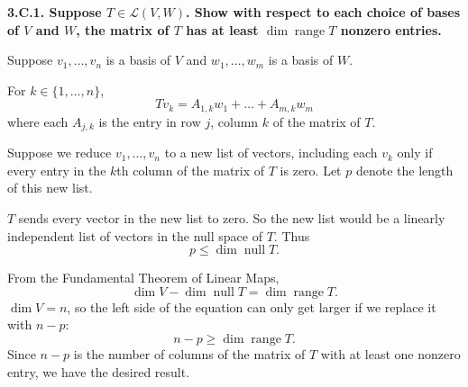 \documentclass[a5paper]{article}
\begin{document}
\newcommand   \C           {\mathbf{C}}
\newcommand   \R           {\mathbf{R}}
\renewcommand \L           {\mathcal{L}}
\newcommand   \F           {\mathbf{F}}
\renewcommand \P           {\mathcal{P}}
\newcommand   \question[1] {\textbf{\boldmath#1\unboldmath}\par}
\newcommand   \op          {\operatorname}

\question{
    3.C.1.
    Suppose $T \in \L(V, W)$.
    Show with respect to each choice of bases of $V$ and $W$, the matrix of $T$ has at least $\op{dim} \op{range} T$ nonzero entries.
}

    Suppose $v_1,\dots,v_n$ is a basis of $V$ and $w_1,\dots,w_m$ is a basis of $W$.

    For $k \in \{1,\dots,n\}$,
\begin{equation*}
        Tv_k = A_{1,k}w_1 + \dots + A_{m,k}w_m
\end{equation*}
    where each $A_{j,k}$ is the entry in row $j$, column $k$ of the matrix of $T$.

    Suppose we reduce $v_1,\dots,v_n$ to a new list of vectors, including each $v_k$ only if every entry in the $k$th column of the matrix of $T$ is zero.
    Let $p$ denote the length of this new list.

    $T$ sends every vector in the new list to zero.
    So the new list would be a linearly independent list of vectors in the null space of $T$.
    Thus
\begin{equation*}
        p \le \op{dim}\op{null}T .
\end{equation*}

    From the Fundamental Theorem of Linear Maps,
\begin{equation*}
        \op{dim}V - \op{dim}\op{null}T = \op{dim}\op{range}T .
\end{equation*}
    $\op{dim}V = n$, so the left side of the equation can only get larger if we replace it with $n - p$:
\begin{equation*}
        n - p \ge \op{dim}\op{range}T .
\end{equation*}
    Since $n - p$ is the number of columns of the matrix of $T$ with at least one nonzero entry, we have the desired result.
\end{document}
